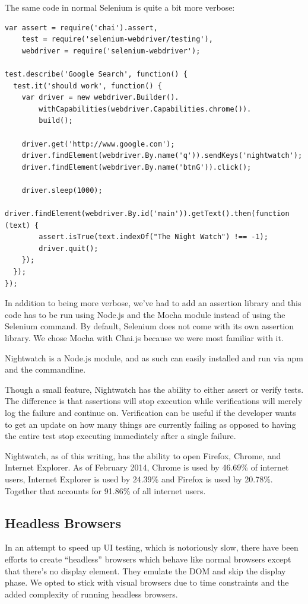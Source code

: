 \documentclass[12pt]{ucthesis}
\begin{document}
The same code in normal Selenium is quite a bit more verbose:
\begin{lstlisting}
var assert = require('chai').assert,
    test = require('selenium-webdriver/testing'),
    webdriver = require('selenium-webdriver');

test.describe('Google Search', function() {
  test.it('should work', function() {
    var driver = new webdriver.Builder().
        withCapabilities(webdriver.Capabilities.chrome()).
        build();

    driver.get('http://www.google.com');
    driver.findElement(webdriver.By.name('q')).sendKeys('nightwatch');
    driver.findElement(webdriver.By.name('btnG')).click();

    driver.sleep(1000);
    driver.findElement(webdriver.By.id('main')).getText().then(function (text) {
        assert.isTrue(text.indexOf("The Night Watch") !== -1);
        driver.quit();
    });
  });
});
\end{lstlisting}

In addition to being more verbose, we've had to add an assertion library and this code has to be run using Node.js and the Mocha module instead of using the Selenium command. By default, Selenium does not come with its own assertion library. We chose Mocha with Chai.js because we were most familiar with it.

Nightwatch is a Node.js module, and as such can easily installed and run via npm and the commandline.

Though a small feature, Nightwatch has the ability to either assert or verify tests. The difference is that assertions will stop execution while verifications will merely log the failure and continue on. Verification can be useful if the developer wants to get an update on how many things are currently failing as opposed to having the entire test stop executing immediately after a single failure.

Nightwatch, as of this writing, has the ability to open Firefox, Chrome, and Internet Explorer. As of February 2014, Chrome is used by 46.69\% of internet users, Internet Explorer is used by 24.39\% and Firefox is used by 20.78\%.\cite{BrowserStats} Together that accounts for 91.86\% of all internet users.

\subsection{Headless Browsers}
In an attempt to speed up UI testing, which is notoriously slow, there have been efforts to create ``headless'' browsers which behave like normal browsers except that there's no display element. They emulate the DOM and skip the display phase. We opted to stick with visual browsers due to time constraints and the added complexity of running headless browsers.
\end{document}
